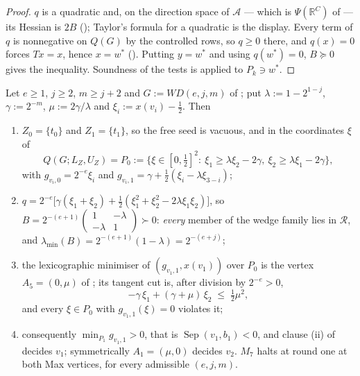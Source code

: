 \begin{proof}
$q$ is a quadratic and, on the direction space of $\mathcal A$ --- which is
$\Psi(\mathbb R^{C})$ of  --- its Hessian is $2B$
(); Taylor's formula for a quadratic is the display.
Every term of $q$ is nonnegative on $Q(G)$ by the controlled rows, so $q\ge0$
there, and $q(x)=0$ forces $Tx=x$, hence $x=w^\ast$
(). Putting $y=w^\ast$ and using
$q(w^\ast)=0$, $B\succeq0$ gives the inequality. Soundness of the tests is
 applied to $P_k\ni w^\ast$.
\end{proof}

\begin{theorem}\label{hz:m7-wedge}
Let $e\ge1$, $j\ge2$, $m\ge j+2$ and $G:=WD(e,j,m)$ of ; put
$\lambda:=1-2^{1-j}$, $\gamma:=2^{-m}$, $\mu:=2\gamma/\lambda$ and
$\xi_i:=x(v_i)-\tfrac12$. Then
\begin{enumerate}[label=\textup{(\alph*)},leftmargin=2.2em]
\item $Z_0=\{t_0\}$ and $Z_1=\{t_1\}$, so the free seed is vacuous, and in the
      coordinates $\xi$ of 
      \[
        Q(G;L_Z,U_Z)=P_0:=\bigl\{\xi\in[0,\tfrac12]^{2}:\
        \xi_1\ge\lambda\xi_2-2\gamma,\ \xi_2\ge\lambda\xi_1-2\gamma\bigr\},
      \]
      with $g_{v_i,0}=2^{-e}\xi_i$ and
      $g_{v_i,1}=\gamma+\tfrac12(\xi_i-\lambda\xi_{3-i})$;
\item $q=2^{-e}\bigl[\gamma(\xi_1+\xi_2)+\tfrac12(\xi_1^{2}+\xi_2^{2}-2\lambda\xi_1\xi_2)\bigr]$,
      so $B=2^{-(e+1)}\left(\begin{smallmatrix}1&-\lambda\\-\lambda&1\end{smallmatrix}\right)\succ0$:
      \emph{every} member of the wedge family lies in $\mathcal R$, and
      $\lambda_{\min}(B)=2^{-(e+1)}(1-\lambda)=2^{-(e+j)}$;
\item the lexicographic minimiser of $(g_{v_1,1},x(v_1))$ over $P_0$ is the
      vertex $A_5=(0,\mu)$ of \Cref{lem:wedge-verts}; its tangent cut is,
      after division by $2^{-e}>0$,
      \[
        -\gamma\,\xi_1+(\gamma+\mu)\,\xi_2\;\le\;\tfrac12\mu^{2},
      \]
      and every $\xi\in P_0$ with $g_{v_1,1}(\xi)=0$ violates it;
\item consequently $\min_{P_1}g_{v_1,1}>0$, that is
      $\operatorname{Sep}(v_1,b_1)<0$, and clause \textup{(ii)} of
      \Cref{rem:own-successor} decides $v_1$; symmetrically $A_1=(\mu,0)$
      decides $v_2$. $M_7$ halts at round one at both Max vertices, for every
      admissible $(e,j,m)$.
\end{enumerate}
\end{theorem}

